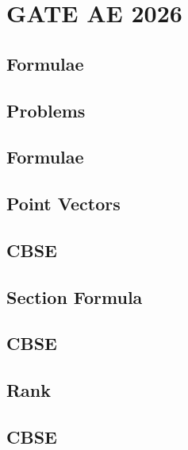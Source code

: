 \documentclass[journal]{IEEEtran}
\begin{document}
\newpage


\tableofcontents

\newpage
\onecolumn


\renewcommand{\thetable}{\theenumi}

\section{GATE AE 2026}
\subsection{Formulae}

\subsection{Problems}

\iffalse
\subsection{Formulae}

\subsection{Point Vectors}

\subsection{CBSE}

%
\subsection{Section Formula}

\subsection{CBSE}

\subsection{Rank}

\subsection{CBSE}

\end{document}
